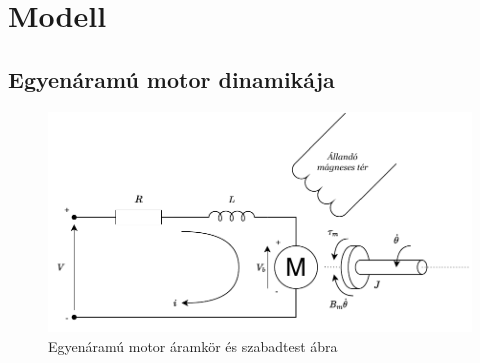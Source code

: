 \chapter{Modell}\label{chap:model}

\section{Egyenáramú motor dinamikája}

\begin{figure}[ht]
\begin{center}
\includegraphics[width=\textwidth]{images/dc_motor_model.pdf}
\caption{Egyenáramú motor áramkör és szabadtest ábra}
\end{center}
\end{figure}

